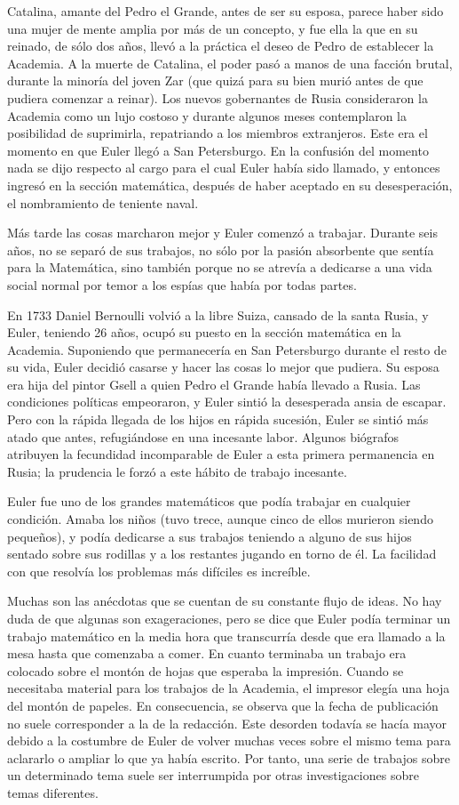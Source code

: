 \documentclass[a4paper, 12pt]{article}
\begin{document}
Catalina, amante del Pedro el Grande, antes de ser su esposa, parece haber sido una mujer de mente amplia por más de un concepto, y fue ella la que en su reinado, de sólo dos años, llevó a la práctica el deseo de Pedro de establecer la Academia. A la muerte de Catalina, el poder pasó a manos de una facción brutal, durante la minoría del joven Zar (que quizá para su bien murió antes de que pudiera comenzar a reinar). Los nuevos gobernantes de Rusia consideraron la Academia como un lujo costoso y durante algunos meses contemplaron la posibilidad de suprimirla, repatriando a los miembros extranjeros. Este era el momento en que Euler llegó a San Petersburgo. En la confusión del momento nada se dijo respecto al cargo para el cual Euler había sido llamado, y entonces ingresó en la sección matemática, después de haber aceptado en su desesperación, el nombramiento de teniente naval.

Más tarde las cosas marcharon mejor y Euler comenzó a trabajar. Durante seis años, no se separó de sus trabajos, no sólo por la pasión absorbente que sentía para la Matemática, sino también porque no se atrevía a dedicarse a una vida social normal por temor a los espías que había por todas partes.

En 1733 Daniel Bernoulli volvió a la libre Suiza, cansado de la santa Rusia, y Euler, teniendo 26 años, ocupó su puesto en la sección matemática en la Academia. Suponiendo que permanecería en San Petersburgo durante el resto de su vida, Euler decidió casarse y hacer las cosas lo mejor que pudiera. Su esposa era hija del pintor Gsell a quien Pedro el Grande había llevado a Rusia. Las condiciones políticas empeoraron, y Euler sintió la desesperada ansia de escapar. Pero con la rápida llegada de los hijos en rápida sucesión, Euler se sintió más atado que antes, refugiándose en una incesante labor. Algunos biógrafos atribuyen la fecundidad incomparable de Euler a esta primera permanencia en Rusia; la prudencia le forzó a este hábito de trabajo incesante.

Euler fue uno de los grandes matemáticos que podía trabajar en cualquier condición. Amaba los niños (tuvo trece, aunque cinco de ellos murieron siendo pequeños), y podía dedicarse a sus trabajos teniendo a alguno de sus hijos sentado sobre sus rodillas y a los restantes jugando en torno de él. La facilidad con que resolvía los problemas más difíciles es increíble.

Muchas son las anécdotas que se cuentan de su constante flujo de ideas. No hay duda de que algunas son exageraciones, pero se dice que Euler podía terminar un trabajo matemático en la media hora que transcurría desde que era llamado a la mesa hasta que comenzaba a comer. En cuanto terminaba un trabajo era colocado sobre el montón de hojas que esperaba la impresión. Cuando se necesitaba material para los trabajos de la Academia, el impresor elegía una hoja del montón de papeles. En consecuencia, se observa que la fecha de publicación no suele corresponder a la de la redacción. Este desorden todavía se hacía mayor debido a la costumbre de Euler de volver muchas veces sobre el mismo tema para aclararlo o ampliar lo que ya había escrito. Por tanto, una serie de trabajos sobre un determinado tema suele ser interrumpida por otras investigaciones sobre temas diferentes.
\end{document}
